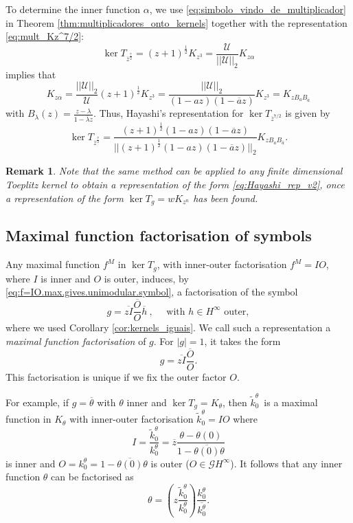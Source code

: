 \documentclass[12pt]{elsarticle}
\numberwithin{equation}{section}
\theoremstyle{plain}
\newtheorem{rem}[thm]{Remark}
\newcommand{\Hinf}{\ensuremath{H^\infty}}
\newcommand{\GG}{\ensuremath{\mathcal{G}}}
\newcommand{\UU}{\ensuremath{\mathcal{U}}}
\newcommand{\ol}[1]{\ensuremath{\overline{#1}}}
\newcommand{\kktilo}{\ensuremath{\tilde k^\theta_0}}
\newcommand{\kko}{\ensuremath{k^\theta_0}}
\begin{document}
To determine the inner function $\alpha$, we use \eqref{eq:simbolo_vindo_de_multiplicador} in Theorem \ref{thm:multiplicadores_onto_kernels} together with the representation \eqref{eq:mult_Kz^7/2}:
\[
\ker T_{\ol z^\frac{7}{2}} = (z+1)^\frac{1}{2} K_{z^3} = \frac{\UU}{||\UU||_2} K_{z\alpha}
\]
implies that
\[
K_{z\alpha} = \frac{||\UU||_2}{\UU} (z+1)^\frac{1}{2} K_{z^3} = \frac{||\UU||_2}{(1 - a z) (1 - \ol a z)} K_{z^3} = K_{z B_a B_{\ol a}}
\]
with $B_\lambda (z) = \frac{z-\lambda}{1- \ol\lambda z}$.
Thus, Hayashi's representation for $\ker T_{\ol z^{7/2}}$ is given by
\[
\ker T_{\ol z^\frac{7}{2}} = \frac{(z+1)^\frac{1}{2} (1 - a z) (1 - \ol a z)}{||(z+1)^\frac{1}{2} (1 - a z) (1 - \ol a z)||_2} K_{z B_a B_{\ol a}}.
\]


\begin{rem}
Note that the same method can be applied to any finite dimensional Toeplitz kernel to obtain a representation of the form \eqref{eq:Hayashi_rep_v2}, once a representation of the form $\ker T_g = w K_{z^n}$ has been found.
\end{rem}






\subsection{Maximal function factorisation of symbols}
\label{subsec:Maximal_function_factorisation_of_symbols}

Any maximal function $f^M$ in $\ker T_g$, with inner-outer factorisation $f^M = IO$, where $I$ is inner and $O$ is outer, induces, by \eqref{eq:f=IO.max.gives.unimodular.symbol}, a factorisation of the symbol
\begin{equation}
\label{eq:fact.from.max.funct}
g = \ol{zI} \frac{\ol O}{O} \ol h \ , \quad \text{ with } h \in\Hinf \text{ outer},
\end{equation}
where we used Corollary \ref{cor:kernels_iguais}.
We call such a representation a {\em maximal function factorisation} of $g$.
For $|g|=1$, it takes the form
\begin{equation}
\label{eq:fact.from.max.funct.unimodular}
g = \ol{zI} \frac{\ol O}{O}.
\end{equation}
This factorisation is unique if we fix the outer factor $O$.

For example, if $g=\ol\theta$ with $\theta$ inner and $\ker T_g = K_\theta$, then \kktilo\ is a maximal function in $K_\theta$ with inner-outer factorisation $\kktilo = IO$ where
\[
I = \frac{\kktilo}{\kko} = \ol z \frac{\theta - \theta(0)}{1 - \ol{\theta(0)} \theta}
\]
is inner and $O = \kko = 1 - \ol{\theta(0)} \theta$ is outer ($O\in\GG\Hinf$).
It follows that any inner function $\theta$ can be factorised as
\begin{equation}
\label{eq:theta_max_fact}
\theta = \left( z \frac{\kktilo}{\kko} \right) \frac{\kko}{\ol\kko}.
\end{equation}
\end{document}
